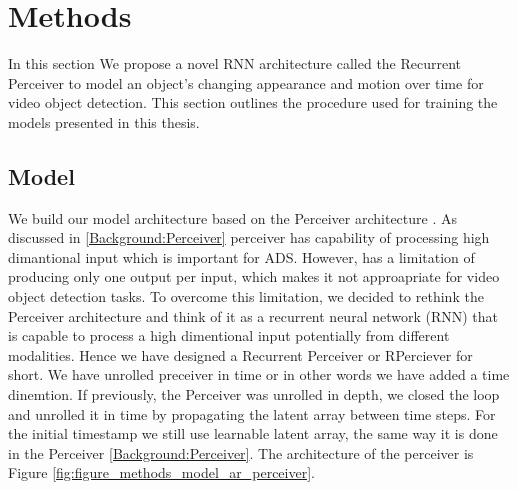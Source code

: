 \section{Methods}  \label{Methods}

In this section We propose a novel RNN architecture called the Recurrent Perceiver to model an object's changing appearance and motion over time for video object detection.
This section outlines the procedure used for training the models presented in this thesis.


\subsection{Model} \label{Methods:Model}

We build our model architecture based on the Perceiver architecture \cite{jaeglePerceiverGeneralPerception2021}. As discussed in \ref{Background:Perceiver} perceiver has capability of processing high dimantional input which is important for ADS. However, has a limitation of producing only one output per input, which makes it not approapriate for video object detection tasks. To overcome this limitation, we decided to rethink the Perceiver architecture and think of it as a recurrent neural network (RNN) that is capable to process a high dimentional input potentially from different modalities. Hence we have designed a Recurrent Perceiver or RPerciever for short. We have unrolled preceiver in time or in other words we have added a time dinemtion. If previously, the Perceiver was unrolled in depth, we closed the loop and unrolled it in time by propagating the latent array between time steps. For the initial timestamp we still use learnable latent array, the same way it is done in the Perceiver \ref{Background:Perceiver}. The architecture of the perceiver is Figure \ref{fig:figure_methods_model_ar_perceiver}.



